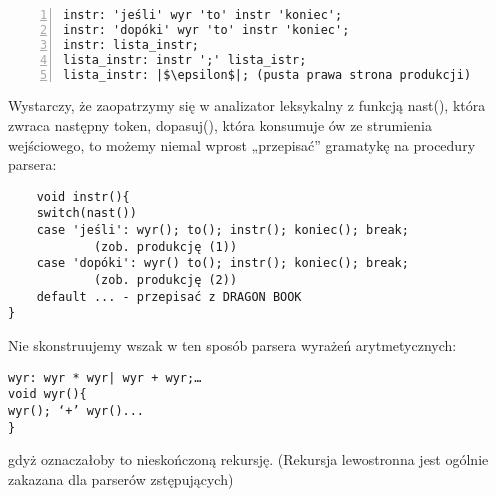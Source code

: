 \begin{lstlisting}[numbers=left]
instr: 'jeśli' wyr 'to' instr 'koniec';
instr: 'dopóki' wyr 'to' instr 'koniec';
instr: lista_instr;
lista_instr: instr ';' lista_istr;
lista_instr: |$\epsilon$|; (pusta prawa strona produkcji)
\end{lstlisting}

Wystarczy, że zaopatrzymy się w analizator leksykalny z funkcją nast(), która zwraca następny token, dopasuj(), która konsumuje ów ze strumienia wejściowego, to możemy niemal wprost „przepisać” gramatykę na procedury parsera:

\begin{lstlisting}
    void instr(){
	switch(nast())
	case 'jeśli': wyr(); to(); instr(); koniec(); break; 
            (zob. produkcję (1))
	case 'dopóki': wyr() to(); instr(); koniec(); break; 
            (zob. produkcję (2))
	default ... - przepisać z DRAGON BOOK
}
\end{lstlisting}
Nie skonstruujemy wszak w ten sposób parsera wyrażeń arytmetycznych:
\begin{lstlisting}
wyr: wyr * wyr| wyr + wyr;…
void wyr(){
wyr(); ‘+’ wyr()...
}
\end{lstlisting}
gdyż oznaczałoby to nieskończoną rekursję. (Rekursja lewostronna jest ogólnie zakazana dla parserów zstępujących)

